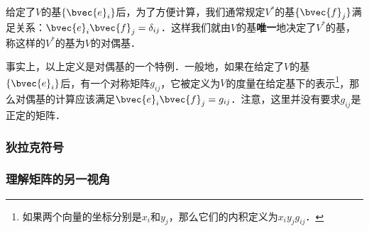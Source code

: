 给定了$V$的基$\{\bvec{e}_i\}$后，为了方便计算，我们通常规定$V^*$的基$\{\bvec{f}_j\}$满足关系：$\bvec{e}_i\bvec{f}_j=\delta_{ij}$．这样我们就由$V$的基\textbf{唯一}地决定了$V^*$的基，称这样的$V^*$的基为$V$的对偶基．

事实上，以上定义是对偶基的一个特例．一般地，如果在给定了$V$的基$\{\bvec{e}_i\}$后，有一个对称矩阵$g_{ij}$，它被定义为$V$的度量在给定基下的表示\footnote{如果两个向量的坐标分别是$x_i$和$y_j$，那么它们的内积定义为$x_iy_jg_{ij}$．}，那么对偶基的计算应该满足$\bvec{e}_i\bvec{f}_j=g_{ij}$．注意，这里并没有要求$g_{ij}$是正定的矩阵．


\subsubsection{狄拉克符号}


\subsubsection{理解矩阵的另一视角}






